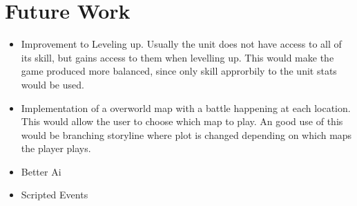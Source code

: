 \section{Future Work}
\begin{itemize}
\item Improvement to Leveling up. 
	Usually the  unit does not have access to all of its skill, but gains access to them when levelling up.  This would make the game produced more balanced, since only skill approrbily to the unit stats would be used.

\item Implementation of a overworld map with a battle happening at each location. This would allow the user to choose which map to play.  An good use of this would be branching storyline where plot is changed depending on which maps the player plays.
 
\item  Better Ai

\item Scripted Events

\end{itemize}